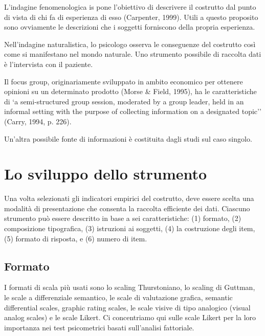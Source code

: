 L'indagine fenomenologica is pone l'obiettivo di descrivere il costrutto dal punto di vista di chi fa di esperienza di esso 
(Carpenter, 1999). Utili a questo proposito sono ovviamente le descrizioni che i soggetti forniscono della propria esperienza.

Nell'indagine naturalistica, lo psicologo osserva le conseguenze del costrutto così come si manifestano nel mondo naturale. Uno strumento possibile di raccolta dati è l'intervista con il paziente. 

Il focus group, originariamente sviluppato in ambito economico per ottenere opinioni su un determinato prodotto (Morse \& Field, 1995), ha le caratteristiche di  `a semi-structured group session, moderated by a group leader, held in an informal setting with the purpose of collecting information on a designated topic'' (Carry, 1994, p. 226). 

Un'altra possibile fonte di informazioni è costituita dagli studi sul caso singolo. 

\section{Lo sviluppo dello strumento}

Una volta selezionati gli indicatori empirici del costrutto, deve essere scelta una modalità di presentazione che consenta la raccolta efficiente dei dati. Ciascuno strumento può essere descritto in base a sei caratteristiche: (1)  formato, (2) composizione tipografica, (3) istruzioni ai soggetti, (4) la costruzione degli item, (5) formato di risposta, e (6) numero di item.

\subsection{Formato}

I formati di scala più usati sono lo scaling Thurstoniano, lo scaling di Guttman, le scale a differenziale semantico, le scale di valutazione grafica, 
semantic differential scales, graphic rating scales, le  scale visive di tipo analogico (visual analog scales) e le scale Likert.  Ci concentriamo qui sulle scale Likert per la loro importanza nei test psicometrici basati sull'analisi fattoriale. 

